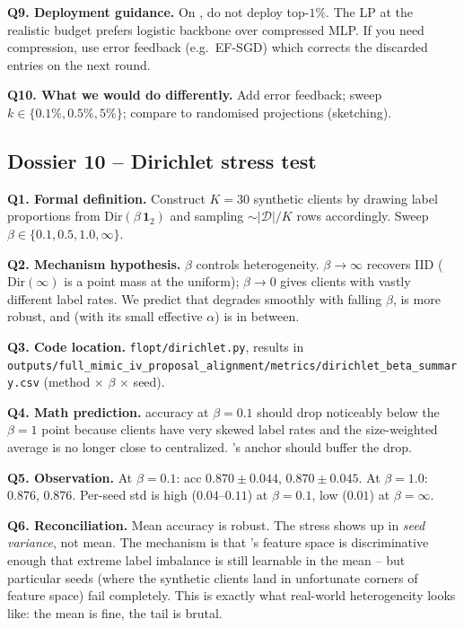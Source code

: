 \textbf{Q9. Deployment guidance.}
On \mimic{}, do not deploy top-$1\%$. The LP at the realistic budget
prefers logistic backbone over compressed MLP. If you need
compression, use error feedback (e.g.\ EF-SGD) which corrects the
discarded entries on the next round.

\textbf{Q10. What we would do differently.}
Add error feedback; sweep $k \!\in\! \{0.1\%, 0.5\%, 5\%\}$; compare
to randomised projections (sketching).

\subsection{Dossier 10 -- Dirichlet stress test}
\label{sec:dossier-dirichlet}

\textbf{Q1. Formal definition.}
Construct $K\!=\!30$ synthetic clients by drawing label proportions
from $\mathrm{Dir}(\beta\,\mathbf{1}_2)$ and sampling
$\sim$$|\mathcal{D}|/K$ rows accordingly. Sweep
$\beta \!\in\! \{0.1, 0.5, 1.0, \infty\}$.

\textbf{Q2. Mechanism hypothesis.}
$\beta$ controls heterogeneity. $\beta\!\to\!\infty$ recovers IID
($\mathrm{Dir}(\infty)$ is a point mass at the uniform); $\beta\!\to\!0$
gives clients with vastly different label rates. We predict that
\fedavg{} degrades smoothly with falling $\beta$, \fedprox{} is more
robust, and \cvar{} (with its small effective $\alpha$) is in
between.

\textbf{Q3. Code location.}
\texttt{flopt/dirichlet.py}, results in
\texttt{outputs/full\_mimic\_iv\_proposal\_alignment/metrics/dirichlet\_beta\_summary.csv}
(method $\times$ $\beta$ $\times$ seed).

\textbf{Q4. Math prediction.}
\fedavg{} accuracy at $\beta\!=\!0.1$ should drop noticeably below
the $\beta\!=\!1$ point because clients have very skewed label rates
and the size-weighted average is no longer close to centralized.
\fedprox{}'s anchor should buffer the drop.

\textbf{Q5. Observation.}
At $\beta\!=\!0.1$: \fedavg{} acc $0.870 \!\pm\! 0.044$, \fedprox{}
$0.870 \!\pm\! 0.045$. At $\beta\!=\!1.0$: \fedavg{} $0.876$,
\fedprox{} $0.876$. Per-seed std is high ($0.04$--$0.11$) at
$\beta\!=\!0.1$, low ($0.01$) at $\beta\!=\!\infty$.

\textbf{Q6. Reconciliation.}
Mean accuracy is robust. The stress shows up in \emph{seed variance},
not mean. The mechanism is that \mimic{}'s feature space is
discriminative enough that extreme label imbalance is still learnable
in the mean -- but particular seeds (where the synthetic clients
land in unfortunate corners of feature space) fail completely. This
is exactly what real-world heterogeneity looks like: the mean is
fine, the tail is brutal.

